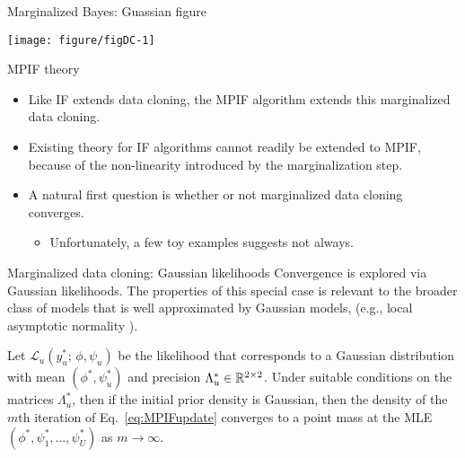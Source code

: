 \documentclass[aspectratio=169]{beamer}\usepackage[]{graphicx}\usepackage[]{xcolor}
\makeatletter
\def\maxwidth{ %
  \ifdim\Gin@nat@width>\linewidth
    \linewidth
  \else
    \Gin@nat@width
  \fi
}
\newenvironment{knitrout}{}{} %
\makeatother
\begin{document}
\begin{frame}{Marginalized Bayes: Guassian figure}

\begin{knitrout}
\color{fgcolor}

{\centering \texttt{[image: figure/figDC-1]} 

}


\end{knitrout}

\end{frame}

\begin{frame}{MPIF theory}

  \begin{itemize}
    \item Like IF extends data cloning, the MPIF algorithm extends this marginalized data cloning.
    \item Existing theory for IF algorithms cannot readily be extended to MPIF, because of the non-linearity introduced by the marginalization step. 
    \item A natural first question is whether or not marginalized data cloning converges.
    \begin{itemize}
      \item Unfortunately, a few toy examples suggests not always.
    \end{itemize}
  \end{itemize}
  
\end{frame}

\begin{frame}{Marginalized data cloning: Gaussian likelihoods}
  Convergence is explored via Gaussian likelihoods.
  The properties of this special case is relevant to the broader class of models that is well approximated by Gaussian models, (e.g., local asymptotic normality \citep{lecam00}).
  
  \begin{theorem}
    Let $\mathcal{L}_u(y_u^*; \, \phi, \psi_u)$ be the likelihood that corresponds to a Gaussian distribution with mean $(\phi^*, \psi_u^*)$ and precision $\Lambda_u^* \in \mathbb{R}^{2\times2}$. Under suitable conditions on the matrices $\Lambda^*_u$, then if the initial prior density is Gaussian, then the density of the $m$th iteration of Eq.~\ref{eq:MPIFupdate} converges to a point mass at the MLE $(\phi^*, \psi_1^*, \ldots, \psi^*_U)$ as $m\rightarrow \infty$.
  \end{theorem}
\end{frame}
\end{document}
